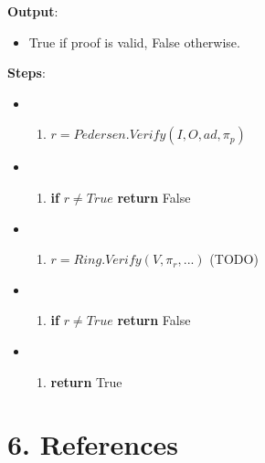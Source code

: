 \documentclass[
]{article}
\providecommand{\tightlist}{%
  \setlength{\itemsep}{0pt}\setlength{\parskip}{0pt}}
\begin{document}
\textbf{Output}:

\begin{itemize}
\tightlist
\item
  True if proof is valid, False otherwise.
\end{itemize}

\textbf{Steps}:

\begin{itemize}
\item
  \begin{enumerate}
  \def\labelenumi{\arabic{enumi}.}
  \tightlist
  \item
    \(r = Pedersen.Verify(I, O, ad, \pi_p)\)
  \end{enumerate}
\item
  \begin{enumerate}
  \def\labelenumi{\arabic{enumi}.}
  \setcounter{enumi}{1}
  \tightlist
  \item
    \textbf{if} \(r \neq True\) \textbf{return} False
  \end{enumerate}
\item
  \begin{enumerate}
  \def\labelenumi{\arabic{enumi}.}
  \setcounter{enumi}{2}
  \tightlist
  \item
    \(r = Ring.Verify(V, \pi_r, ...)\) (TODO)
  \end{enumerate}
\item
  \begin{enumerate}
  \def\labelenumi{\arabic{enumi}.}
  \setcounter{enumi}{3}
  \tightlist
  \item
    \textbf{if} \(r \neq True\) \textbf{return} False
  \end{enumerate}
\item
  \begin{enumerate}
  \def\labelenumi{\arabic{enumi}.}
  \setcounter{enumi}{3}
  \tightlist
  \item
    \textbf{return} True
  \end{enumerate}
\end{itemize}

\hypertarget{references}{%
\section*{6. References}\label{references}}
\end{document}
